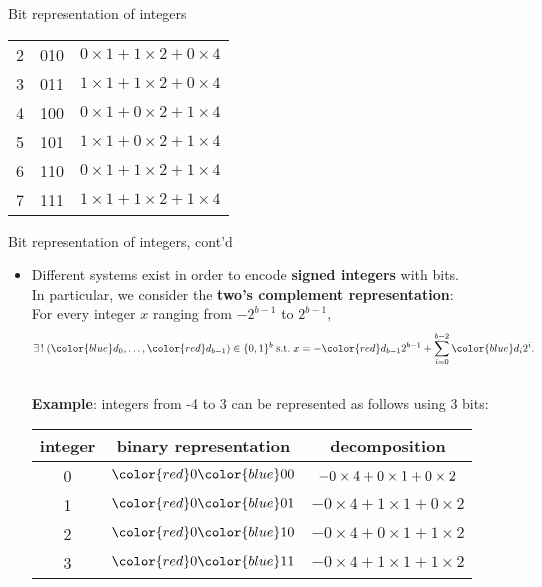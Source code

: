 \documentclass[t,usepdftitle=false]{beamer}
\begin{document}
\begin{frame}{Bit representation of integers}
\begin{itemize}
{\begin{center}
\begin{tabular}{|c|c|c|}
2& 010 & $0\times 1+1\times 2+0\times 4$\\
3& 011 & $1\times 1+1\times 2+0\times 4$\\
4& 100 & $0\times 1+0\times 2+1\times 4$\\
5& 101 & $1\times 1+0\times 2+1\times 4$\\
6& 110 & $0\times 1+1\times 2+1\times 4$\\
7& 111 & $1\times 1+1\times 2+1\times 4$\\
\hline
\end{tabular}
\end{center}
}
\end{itemize} 
\end{frame}

\begin{frame}{Bit representation of integers, cont'd} 
\begin{itemize} 
\item Different systems exist in order to encode \textbf{signed integers} with bits.\\
In particular, we consider the \textbf{two's complement representation}:\vspace{.1cm}\\
For every integer $x$ ranging from $-2^{b-1}$ to $2^{b-1}$,\vspace{-.2cm}
\begin{align*}
\exists\,!\;({\color{blue}d_{0}},\dots,{\color{red}d_{b-1}})\in\{0,1\}^b\;\text{s.t.}\;x=-{\color{red}d_{b-1}}2^{b-1}+\sum_{i=0}^{b-2}{\color{blue}d_{i}}2^i.
\end{align*}
\vspace*{-.2cm}\\
\textbf{Example}: integers from -4 to 3 can be represented as follows using 3 bits:\vspace{.15cm}\\
{\scriptsize
\begin{center}
\begin{tabular}{|c|c|c|}
\hline
integer & binary representation & decomposition\\
\hline
0& ${\color{red}0}{\color{blue}00}$ & $-0\times 4+0\times 1+0\times 2^{{\vphantom{I}}}$\\ 
1& ${\color{red}0}{\color{blue}01}$ & $-0\times 4+1\times 1+0\times 2$\\ 
2& ${\color{red}0}{\color{blue}10}$ & $-0\times 4+0\times 1+1\times 2$\\ 
3& ${\color{red}0}{\color{blue}11}$ & $-0\times 4+1\times 1+1\times 2$\\ 

\end{tabular}
\end{center}}
\end{itemize}
\end{frame}
\end{document}
